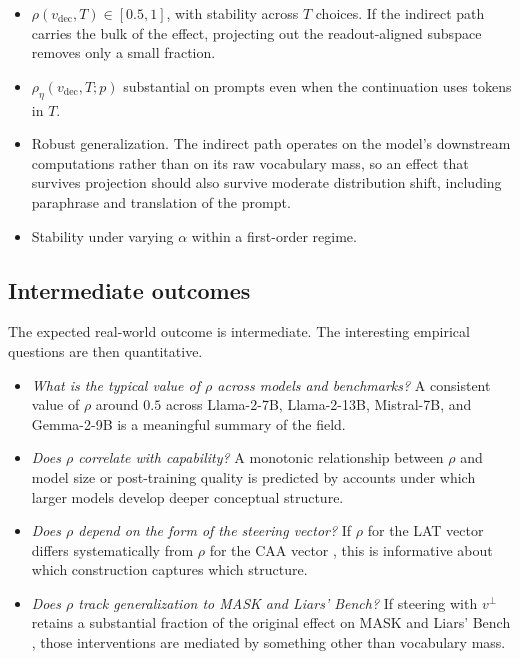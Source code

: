 \documentclass[11pt,letterpaper]{article}
\theoremstyle{plain}
\theoremstyle{definition}
\newcommand{\1}{\mathbf{1}}
\newcommand{\vdec}{v_{\text{dec}}}
\newcommand{\vperp}{v^{\perp}}
\begin{document}
\begin{itemize}[leftmargin=*]
\item $\rho(\vdec, T) \in [0.5, 1]$, with stability across $T$ choices. If the indirect path carries the bulk of the effect, projecting out the readout-aligned subspace removes only a small fraction.
\item $\rho_\eta(\vdec, T; p)$ substantial on prompts even when the continuation uses tokens in $T$.
\item Robust generalization. The indirect path operates on the model's downstream computations rather than on its raw vocabulary mass, so an effect that survives projection should also survive moderate distribution shift, including paraphrase and translation of the prompt.
\item Stability under varying $\alpha$ within a first-order regime.
\end{itemize}

\subsection{Intermediate outcomes}

The expected real-world outcome is intermediate. The interesting empirical questions are then quantitative.

\begin{itemize}[leftmargin=*]
\item \emph{What is the typical value of $\rho$ across models and benchmarks?} A consistent value of $\rho$ around $0.5$ across Llama-2-7B, Llama-2-13B, Mistral-7B, and Gemma-2-9B is a meaningful summary of the field.
\item \emph{Does $\rho$ correlate with capability?} A monotonic relationship between $\rho$ and model size or post-training quality is predicted by accounts under which larger models develop deeper conceptual structure.
\item \emph{Does $\rho$ depend on the form of the steering vector?} If $\rho$ for the LAT vector \cite{zou2023repe} differs systematically from $\rho$ for the CAA vector \cite{rimsky2024caa}, this is informative about which construction captures which structure.
\item \emph{Does $\rho$ track generalization to MASK and Liars' Bench?} If steering with $\vperp$ retains a substantial fraction of the original effect on MASK \cite{ren2025mask} and Liars' Bench \cite{kretschmar2025liarsbench}, those interventions are mediated by something other than vocabulary mass.
\end{itemize}
\end{document}
